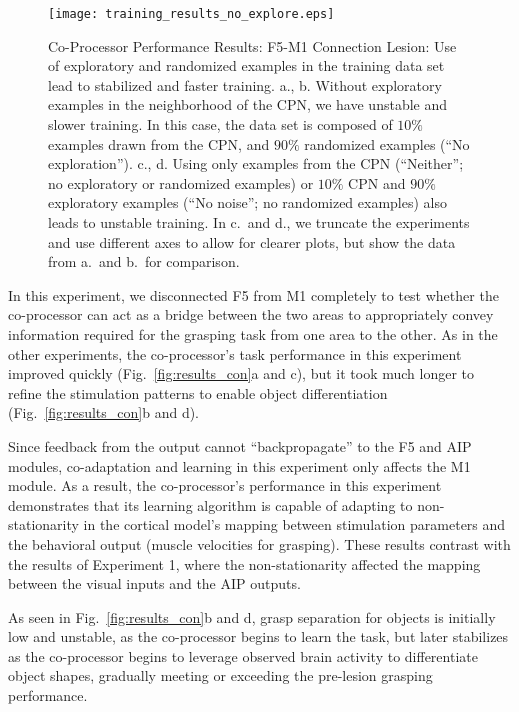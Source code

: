\documentclass[12pt]{iopart}
\begin{document}
\begin{figure}[h]
\centering
\texttt{[image: training\_results\_no\_explore.eps]}
\caption{Co-Processor Performance Results: F5-M1 Connection Lesion: Use of exploratory
         and randomized examples in the training data set lead to stabilized
         and faster training. a., b. Without exploratory examples in the
         neighborhood of the CPN, we have unstable and slower training. In
         this case, the data set is composed of $10\%$ examples drawn from the
         CPN, and $90\%$ randomized examples (``No exploration'').
         c., d. Using only examples from the CPN (``Neither''; no exploratory or randomized examples) or $10\%$ CPN
         and $90\%$ exploratory examples (``No noise''; no randomized examples) also
         leads to unstable training. In c.\ and d., we truncate the experiments and use different
         axes to allow for clearer plots, but show the data from a.\ and b.\ for
         comparison.
         }
\label{fig:results_con_no_explore}
\end{figure}

In this experiment, we disconnected F5 from M1 completely to test whether the co-processor can
act as a bridge between the two areas to appropriately convey information required for the grasping
task from one area to the other. As in the other experiments, the co-processor's task performance in this
experiment improved quickly (Fig.~\ref{fig:results_con}a and c), but it took much longer to refine the
stimulation patterns to enable object differentiation (Fig.~\ref{fig:results_con}b and d). 

Since feedback from the output cannot ``backpropagate'' to the F5 and AIP modules, co-adaptation and
learning in this experiment only affects the M1 module. As a result, the co-processor's performance in
this experiment demonstrates that its learning algorithm is capable of adapting to non-stationarity
in the cortical model's mapping between stimulation parameters and the behavioral output (muscle velocities
for grasping). These results contrast  with the results of Experiment 1, where the non-stationarity affected
the mapping between the visual inputs and the AIP outputs.

As seen in Fig.~\ref{fig:results_con}b and d, grasp separation for objects is initially low and unstable,
as the co-processor begins to learn the task, but later stabilizes as the co-processor begins to
leverage observed brain activity to differentiate object shapes, gradually meeting or exceeding the
pre-lesion grasping performance.
\end{document}
